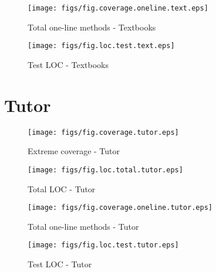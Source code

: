 \begin{figure}[htbp]
  \begin{minipage}[htbp]{.45\linewidth}
    \begin{center}
      \texttt{[image: figs/fig.coverage.oneline.text.eps]}
      \caption{Total one-line methods - Textbooks}
      \label{fig:coverage.oneline.test.text}
    \end{center}
  \end{minipage}
\hfill
  \begin{minipage}[htbp]{.45\linewidth}
    \begin{center}
      \texttt{[image: figs/fig.loc.test.text.eps]}
      \caption{Test LOC - Textbooks}
      \label{fig:loc.test.text}
    \end{center}
  \end{minipage}
\end{figure}

\clearpage


\section {Tutor}

\begin{figure}[htbp]
  \begin{minipage}[htbp]{.45\linewidth}
    \begin{center}
      \texttt{[image: figs/fig.coverage.tutor.eps]}
      \caption{Extreme coverage - Tutor}
      \label{fig:coverage.tutor}
    \end{center}
  \end{minipage}
\hfill
  \begin{minipage}[htbp]{.45\linewidth}
    \begin{center}
      \texttt{[image: figs/fig.loc.total.tutor.eps]}
      \caption{Total LOC - Tutor}
      \label{fig:loc.total.tutor}
    \end{center}
  \end{minipage}
\end{figure}

\begin{figure}[htbp]
  \begin{minipage}[htbp]{.45\linewidth}
    \begin{center}
      \texttt{[image: figs/fig.coverage.oneline.tutor.eps]}
      \caption{Total one-line methods - Tutor}
      \label{fig:coverage.oneline.test.tutor}
    \end{center}
  \end{minipage}
\hfill
  \begin{minipage}[htbp]{.45\linewidth}
    \begin{center}
      \texttt{[image: figs/fig.loc.test.tutor.eps]}
      \caption{Test LOC - Tutor}
      \label{fig:loc.test.tutor}
    \end{center}
  \end{minipage}
\end{figure}

